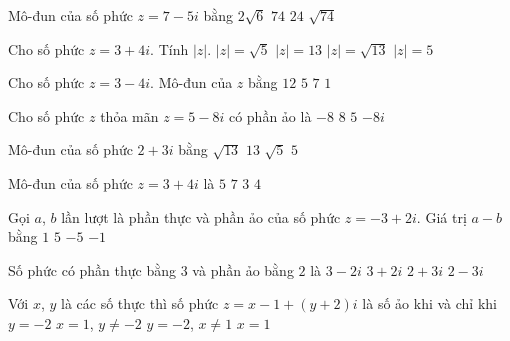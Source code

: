 \begin{ex}%
	Mô-đun của số phức $z=7-5i$ bằng
	\choice
	{$2\sqrt{6}$}
	{$74$}
	{$24$}
	{\True $\sqrt{74}$}
\end{ex}
\begin{ex}%
	Cho số phức $z=3+4i$. Tính $|z|$.
	\choice
	{$|z|=\sqrt{5}$}
	{$|z|=13$}
	{$|z|=\sqrt{13}$}
	{\True $|z|=5$}
\end{ex}
\begin{ex}%
	Cho số phức $z=3-4i$. Mô-đun của $z$ bằng
	\choice
	{$12$}
	{\True $5$}
	{$7$}
	{$1$}
\end{ex}
\begin{ex}%
	Cho số phức $z$ thỏa mãn $z=5-8i$ có phần ảo là
	\choice
	{\True $-8$}
	{$8$}
	{$5$}
	{$-8i$}
\end{ex}
\begin{ex}%
	Mô-đun của số phức $2+3i$ bằng
	\choice
	{\True $\sqrt{13}$}
	{$13$}
	{$\sqrt{5}$}
	{$5$}
\end{ex}
\begin{ex}%
	Mô-đun của số phức $z=3+4i$ là
	\choice
	{\True $5$}
	{$7$}
	{$3$}
	{$4$}
\end{ex}
\begin{ex}%
	Gọi $a$, $b$ lần lượt là phần thực và phần ảo của số phức $z=-3+2i$. Giá trị $a-b$ bằng
	\choice
	{$1$}
	{$5$}
	{\True $-5$}
	{$-1$}
\end{ex}
\begin{ex}%
	Số phức có phần thực bằng $3$ và phần ảo bằng $2$ là
	\choice
	{$3-2i$}
	{\True $3+2i$}
	{$2+3i$}
	{$2-3i$}
\end{ex}
\begin{ex}%
	Với $x$, $y$ là các số thực thì số phức $z=x-1+(y+2)i$ là số ảo khi và chỉ khi
	\choice
	{$y=-2$}
	{$x=1$, $y\ne -2$}
	{$y=-2$, $x\ne 1$}
	{\True $x=1$}
\end{ex}
